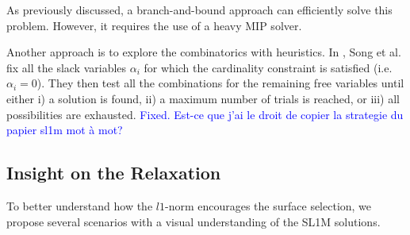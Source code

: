 As previously discussed, a branch-and-bound approach can efficiently solve this problem. 
However, it requires the use of a heavy MIP solver.

Another approach is to explore the combinatorics with heuristics.
In \cite{sl1m_v2}, Song et al. fix all the slack variables $\alpha_i$ for which the cardinality constraint is satisfied (i.e. $\alpha_i=0$). 
They then test all the combinations for the remaining free variables until either i) a solution is found, ii) a maximum number of trials is reached, or iii) all possibilities are exhausted.  \textcolor{blue}{Fixed. Est-ce que j'ai le droit de copier la strategie du papier sl1m mot à mot?}

\subsection{Insight on the Relaxation}
\label{subsub:insight_l1}
To better understand how the $l1$-norm encourages the surface selection, we propose several scenarios with a visual understanding of the SL1M solutions.

